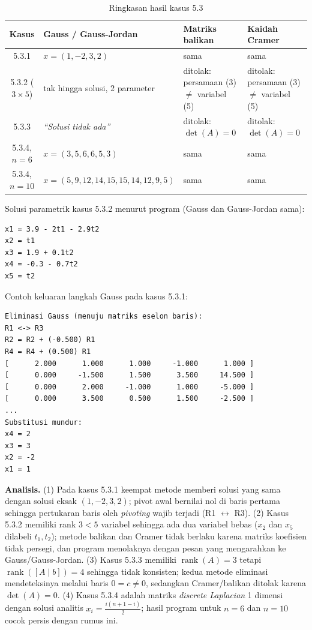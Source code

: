 \documentclass[12pt,a4paper]{article}
\begin{document}
\begin{table}[H]
\centering\small
\renewcommand{\arraystretch}{1.25}
\begin{tabular}{@{}cp{4.7cm}p{3.4cm}p{3.4cm}@{}}
\toprule
\textbf{Kasus} & \textbf{Gauss / Gauss-Jordan} & \textbf{Matriks balikan} & \textbf{Kaidah Cramer}\\
\midrule
5.3.1 & $x=(1,-2,3,2)$ & sama & sama\\
5.3.2 ($3\times5$) & tak hingga solusi, 2 parameter & ditolak: persamaan (3) $\neq$ variabel (5) & ditolak: persamaan (3) $\neq$ variabel (5)\\
5.3.3 & \textit{``Solusi tidak ada''} & ditolak: $\det(A)=0$ & ditolak: $\det(A)=0$\\
5.3.4, $n=6$ & $x=(3,5,6,6,5,3)$ & sama & sama\\
5.3.4, $n=10$ & $x=(5,9,12,14,15,15,14,12,9,5)$ & sama & sama\\
\bottomrule
\end{tabular}
\caption{Ringkasan hasil kasus 5.3}
\end{table}

Solusi parametrik kasus 5.3.2 menurut program (Gauss dan Gauss-Jordan sama):
\begin{lstlisting}
x1 = 3.9 - 2t1 - 2.9t2
x2 = t1
x3 = 1.9 + 0.1t2
x4 = -0.3 - 0.7t2
x5 = t2
\end{lstlisting}
Contoh keluaran langkah Gauss pada kasus 5.3.1:
\begin{lstlisting}
Eliminasi Gauss (menuju matriks eselon baris):
R1 <-> R3
R2 = R2 + (-0.500) R1
R4 = R4 + (0.500) R1
[      2.000      1.000      1.000     -1.000      1.000 ]
[      0.000     -1.500      1.500      3.500     14.500 ]
[      0.000      2.000     -1.000      1.000     -5.000 ]
[      0.000      3.500      0.500      1.500     -2.500 ]
...
Substitusi mundur:
x4 = 2
x3 = 3
x2 = -2
x1 = 1
\end{lstlisting}

\textbf{Analisis.} (1) Pada kasus 5.3.1 keempat metode memberi solusi yang sama dengan solusi eksak $(1,-2,3,2)$; pivot awal bernilai nol di baris pertama sehingga pertukaran baris oleh \textit{pivoting} wajib terjadi (R1 $\leftrightarrow$ R3). (2) Kasus 5.3.2 memiliki rank $3<5$ variabel sehingga ada dua variabel bebas ($x_2$ dan $x_5$ dilabeli $t_1,t_2$); metode balikan dan Cramer tidak berlaku karena matriks koefisien tidak persegi, dan program menolaknya dengan pesan yang mengarahkan ke Gauss/Gauss-Jordan. (3) Kasus 5.3.3 memiliki $\operatorname{rank}(A)=3$ tetapi $\operatorname{rank}([A\mid b])=4$ sehingga tidak konsisten; kedua metode eliminasi mendeteksinya melalui baris $0=c\neq0$, sedangkan Cramer/balikan ditolak karena $\det(A)=0$. (4) Kasus 5.3.4 adalah matriks \textit{discrete Laplacian} 1 dimensi dengan solusi analitis $x_i=\tfrac{i(n+1-i)}{2}$; hasil program untuk $n=6$ dan $n=10$ cocok persis dengan rumus ini.
\end{document}
